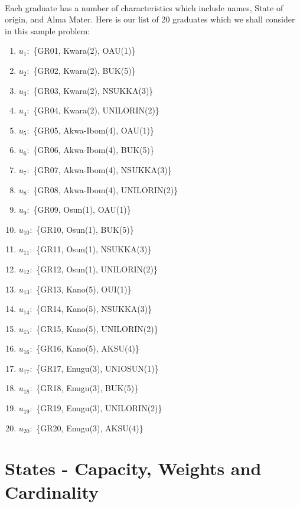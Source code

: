 \documentclass[a4paper,openany]{book}
\begin{document}
			\paragraph{}
				Each graduate has a number of characteristics which include names, State of origin, and Alma Mater. Here is our list of 20 graduates which we shall consider in this sample problem:
				\begin{enumerate}
					\item $u_1\colon$ \{GR01, Kwara(2), OAU(1)\}
					\item $u_2\colon$ \{GR02, Kwara(2), BUK(5)\}
					\item $u_3\colon$ \{GR03, Kwara(2), NSUKKA(3)\}
					\item $u_4\colon$ \{GR04, Kwara(2), UNILORIN(2)\}
					\item $u_5\colon$ \{GR05, Akwa-Ibom(4), OAU(1)\}
					\item $u_6\colon$ \{GR06, Akwa-Ibom(4), BUK(5)\}
					\item $u_7\colon$ \{GR07, Akwa-Ibom(4), NSUKKA(3)\}
					\item $u_8\colon$ \{GR08, Akwa-Ibom(4), UNILORIN(2)\}
					\item $u_9\colon$ \{GR09, Osun(1), OAU(1)\}
					\item $u_{10}\colon$ \{GR10, Osun(1), BUK(5)\}
					\item $u_{11}\colon$ \{GR11, Osun(1), NSUKKA(3)\}
					\item $u_{12}\colon$ \{GR12, Osun(1), UNILORIN(2)\}
					\item $u_{13}\colon$ \{GR13, Kano(5), OUI(1)\}
					\item $u_{14}\colon$ \{GR14, Kano(5), NSUKKA(3)\}
					\item $u_{15}\colon$ \{GR15, Kano(5), UNILORIN(2)\}
					\item $u_{16}\colon$ \{GR16, Kano(5), AKSU(4)\}
					\item $u_{17}\colon$ \{GR17, Enugu(3), UNIOSUN(1)\}
					\item $u_{18}\colon$ \{GR18, Enugu(3), BUK(5)\}
					\item $u_{19}\colon$ \{GR19, Enugu(3), UNILORIN(2)\}
					\item $u_{20}\colon$ \{GR20, Enugu(3), AKSU(4)\}
				\end{enumerate}
		\section{States - Capacity, Weights and Cardinality}
\end{document}
